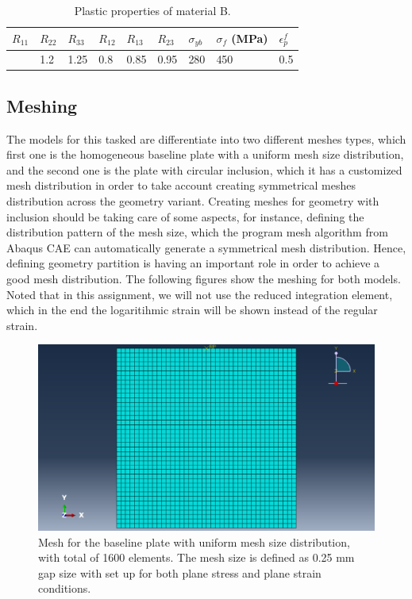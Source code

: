 \documentclass[12pt]{article}
\begin{document}
\begin{table}[H]
    \centering
    \caption{Plastic properties of material B.}
    \label{tab:materialB-plasticproperties}
    \begin{tabular}{lllllllll}
        \toprule
            \centering $R_{11}$ & $R_{22}$ & $R_{33}$ & $R_{12}$ & $R_{13}$ & $R_{23}$ & $\sigma_{yb}$ & 
            $\sigma_{f}$ (MPa) & $\epsilon_{p}^{f}$  \\
            \midrule
            \centering 1 & 1.2 & 1.25 & 0.8 & 0.85 & 0.95 & 280 & 450 & 0.5 \\
            \bottomrule
    \end{tabular}
\end{table}
\subsection{Meshing}
\hspace{2em}The models for this tasked are differentiate into two different 
meshes types, which first one is the homogeneous baseline plate 
with a uniform mesh size distribution, and the 
second one is the plate with circular inclusion,
which it has a customized mesh distribution in order to 
take account creating symmetrical meshes distribution 
across the geometry variant. Creating meshes for geometry with inclusion
should be taking care of some aspects, for instance, defining the distribution 
pattern of the mesh size, which the program mesh algorithm from Abaqus
CAE can automatically generate a symmetrical mesh distribution. Hence, 
defining geometry partition is having an important role in order to achieve
a good mesh distribution. The following figures show the meshing
for both models. Noted that in this assignment, we will not use the
reduced integration element, which in the end the logaritihmic strain
will be shown instead of the regular strain. 
\begin{figure}[H]
    \centering
    \includegraphics[width=1\textwidth]{images/MeshQ1.png}
    \caption{Mesh for the baseline plate with uniform mesh size distribution, 
    with total of 1600 elements. The mesh size is defined as 0.25 mm
    gap size with set up for both plane stress and plane strain
    conditions.}
    \label{fig:MeshQ1}
\end{figure}
\end{document}
